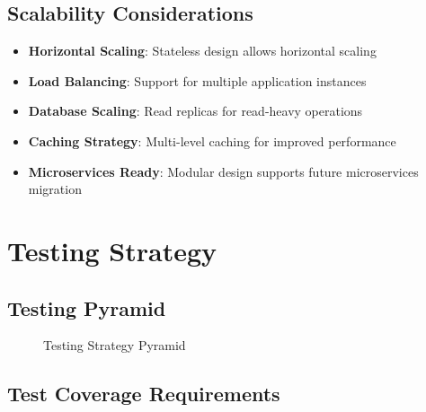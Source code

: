 \documentclass[12pt,a4paper]{article}
\begin{document}
\subsection{Scalability Considerations}

\begin{itemize}
    \item \textbf{Horizontal Scaling}: Stateless design allows horizontal scaling
    \item \textbf{Load Balancing}: Support for multiple application instances
    \item \textbf{Database Scaling}: Read replicas for read-heavy operations
    \item \textbf{Caching Strategy}: Multi-level caching for improved performance
    \item \textbf{Microservices Ready}: Modular design supports future microservices migration
\end{itemize}

\section{Testing Strategy}

\subsection{Testing Pyramid}

\begin{figure}[H]
\centering
{}
\caption{Testing Strategy Pyramid}
\label{fig:testing-pyramid}
\end{figure}

\subsection{Test Coverage Requirements}
\end{document}
